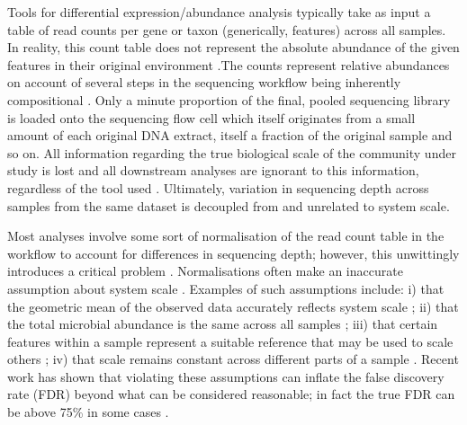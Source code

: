 \documentclass[10pt,letterpaper]{article}
\begin{document}
Tools for differential expression/abundance analysis typically take as input a table of read counts per gene or taxon (generically, features) across all samples. In reality, this count table does not represent the absolute abundance of the given features in their original environment \cite{gloor_its_2016,vandeputte_quantitative_2017}.The counts represent relative abundances on account of several steps in the sequencing workflow being inherently compositional \cite{gloor_compositional_2016}. Only a minute proportion of the final, pooled sequencing library is loaded onto the sequencing flow cell which itself originates from a small amount of each original DNA extract, itself a fraction of the original sample and so on. All information regarding the true biological scale of the community under study is lost and all downstream analyses are ignorant to this information, regardless of the tool used \cite{lovell_proportions_2011}. Ultimately, variation in sequencing depth across samples from the same dataset is decoupled from and unrelated to system scale.

Most analyses involve some sort of normalisation of the read count table in the workflow to account for differences in sequencing depth; however, this unwittingly introduces a critical problem \cite{weiss_normalization_2017}. Normalisations often make an inaccurate assumption about system scale \cite{nixon_scale_2024, nixon_incorporating_2025, gloor_explicit_2025}. Examples of such assumptions include: i) that the geometric mean of the observed data accurately reflects system scale \cite{aitchison_statistical_1986}; ii) that the total microbial abundance is the same across all samples \cite{hughes_rarefaction_2005}; iii) that certain features within a sample represent a suitable reference that may be used to scale others \cite{robinson_scaling_2010,vandesompele_accurate_2002}; iv) that scale remains constant across different parts of a sample \cite{anders_2010_differential}. Recent work has shown that violating these assumptions can inflate the false discovery rate (FDR) beyond what can be considered reasonable; in fact the true FDR can be above 75\% in some cases \cite{li_exaggerated_2022,konnaris_uncertainty_2025,nixon_incorporating_2025,gloor_explicit_2025}.
\end{document}
